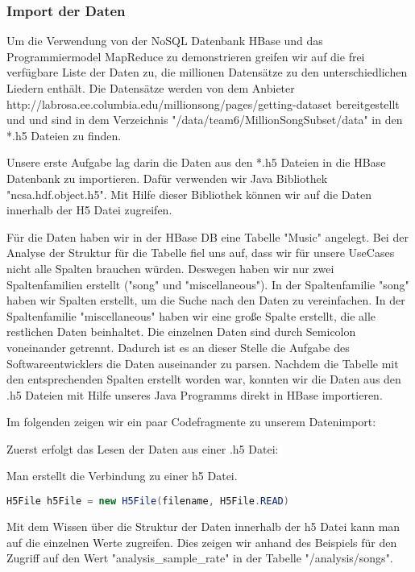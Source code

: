 \subsubsection{Import der Daten}
Um die Verwendung von der NoSQL Datenbank HBase und das Programmiermodel MapReduce zu demonstrieren greifen wir auf die frei verfügbare Liste der Daten zu, die millionen Datensätze zu den unterschiedlichen Liedern enthält. Die Datensätze werden von dem Anbieter http://labrosa.ee.columbia.edu/millionsong/pages/getting-dataset bereitgestellt und und sind in dem Verzeichnis "/data/team6/MillionSongSubset/data" in den *.h5 Dateien zu finden. 

Unsere erste Aufgabe lag darin die Daten aus den *.h5 Dateien in die HBase Datenbank zu importieren.
Dafür verwenden wir Java Bibliothek "ncsa.hdf.object.h5". Mit Hilfe dieser Bibliothek können wir auf die Daten innerhalb der H5 Datei zugreifen.

Für die Daten haben wir in der HBase DB eine Tabelle "Music" angelegt. Bei der Analyse der Struktur für die Tabelle fiel uns auf, dass wir für unsere UseCases nicht alle Spalten brauchen würden. Deswegen haben wir nur zwei Spaltenfamilien erstellt ("song" und "miscellaneous"). In der Spaltenfamilie "song" haben wir Spalten erstellt, um die Suche nach den Daten zu vereinfachen. In der Spaltenfamilie "miscellaneous" haben wir eine große Spalte erstellt, die alle restlichen Daten beinhaltet. Die einzelnen Daten sind durch Semicolon voneinander getrennt. Dadurch ist es an dieser Stelle die Aufgabe des Softwareentwicklers die Daten auseinander zu parsen.
Nachdem die Tabelle mit den entsprechenden Spalten erstellt worden war, konnten wir die Daten aus den .h5 Dateien mit Hilfe unseres Java Programms direkt in HBase importieren.

Im folgenden zeigen wir ein paar Codefragmente zu unserem Datenimport:

Zuerst erfolgt das Lesen der Daten aus einer .h5 Datei:

Man erstellt die Verbindung zu einer h5 Datei.
\begin{lstlisting}[language=Java]
H5File h5File = new H5File(filename, H5File.READ)
\end{lstlisting}

Mit dem Wissen über die Struktur der Daten innerhalb der h5 Datei kann man auf die einzelnen Werte zugreifen. Dies zeigen wir anhand des Beispiels für den Zugriff auf den Wert "analysis_sample_rate" in der Tabelle "/analysis/songs".

